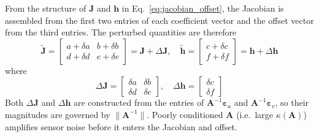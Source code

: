 \documentclass[lettersize,journal]{IEEEtran}
\begin{document}
From the structure of $\mathbf{J}$ and $\mathbf{h}$ in Eq.~\eqref{eq:jacobian_offset}, the Jacobian is assembled from the first two entries of each coefficient vector and the offset vector from the third entries. The perturbed quantities are therefore
\begin{equation}
    \tilde{\mathbf{J}} = \begin{bmatrix} a+\delta a & b+\delta b \\ d+\delta d & e+\delta e \end{bmatrix} = \mathbf{J} + \Delta\mathbf{J}, \quad
    \tilde{\mathbf{h}} = \begin{bmatrix} c+\delta c \\ f+\delta f \end{bmatrix} = \mathbf{h} + \Delta\mathbf{h}
    \label{eq:perturbed_J_h}
\end{equation}
where
\begin{equation}
    \Delta\mathbf{J} = \begin{bmatrix} \delta a & \delta b \\ \delta d & \delta e \end{bmatrix}, \quad
    \Delta\mathbf{h} = \begin{bmatrix} \delta c \\ \delta f \end{bmatrix}
    \label{eq:Delta_J_h_meas}
\end{equation}
Both $\Delta\mathbf{J}$ and $\Delta\mathbf{h}$ are constructed from the entries of $\mathbf{A}^{-1}\boldsymbol{\varepsilon}_u$ and $\mathbf{A}^{-1}\boldsymbol{\varepsilon}_v$, so their magnitudes are governed by $\|\mathbf{A}^{-1}\|$. Poorly conditioned $\mathbf{A}$ (i.e.\ large $\kappa(\mathbf{A})$) amplifies sensor noise before it enters the Jacobian and offset.
\end{document}
